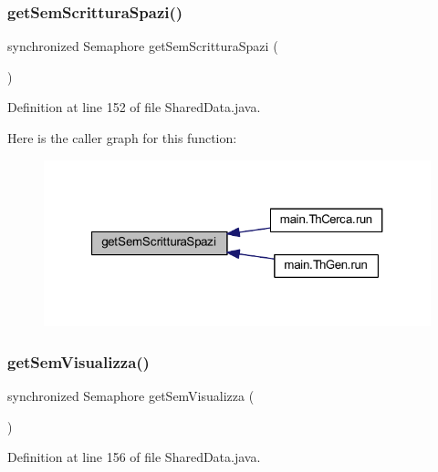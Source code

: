 \subsubsection{\texorpdfstring{get\+Sem\+Scrittura\+Spazi()}{getSemScritturaSpazi()}}
{\footnotesize\ttfamily synchronized Semaphore get\+Sem\+Scrittura\+Spazi (\begin{DoxyParamCaption}{ }\end{DoxyParamCaption})}



Definition at line 152 of file Shared\+Data.\+java.

Here is the caller graph for this function\+:
\nopagebreak
\begin{figure}[H]
\begin{center}
\leavevmode
\includegraphics[width=321pt]{classmain_1_1_shared_data_a10670dfbf4c72ab35617e5ee0d73271d_icgraph}
\end{center}
\end{figure}
\mbox{\label{classmain_1_1_shared_data_aa61763e3e67d28f279815eda9e81e0bd}} 
\subsubsection{\texorpdfstring{get\+Sem\+Visualizza()}{getSemVisualizza()}}
{\footnotesize\ttfamily synchronized Semaphore get\+Sem\+Visualizza (\begin{DoxyParamCaption}{ }\end{DoxyParamCaption})}



Definition at line 156 of file Shared\+Data.\+java.

